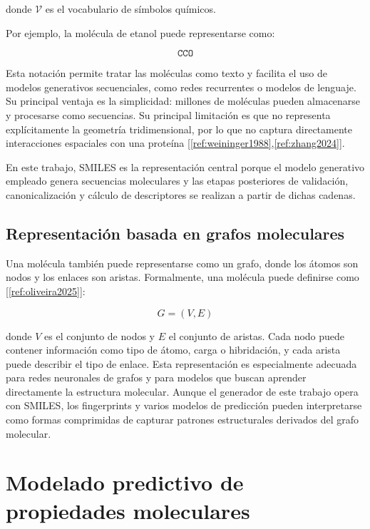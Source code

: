 \documentclass[IB]{TFUOC}%
\begin{document}
donde $\mathcal{V}$ es el vocabulario de símbolos químicos.

Por ejemplo, la molécula de etanol puede representarse como:

\begin{equation}
\texttt{CCO}
\end{equation}

Esta notación permite tratar las moléculas como texto y facilita el uso de modelos generativos secuenciales, como redes recurrentes o modelos de lenguaje. Su principal ventaja es la simplicidad: millones de moléculas pueden almacenarse y procesarse como secuencias. Su principal limitación es que no representa explícitamente la geometría tridimensional, por lo que no captura directamente interacciones espaciales con una proteína [\ref{ref:weininger1988},\ref{ref:zhang2024}].

En este trabajo, SMILES es la representación central porque el modelo generativo empleado genera secuencias moleculares y las etapas posteriores de validación, canonicalización y cálculo de descriptores se realizan a partir de dichas cadenas.

\subsection{Representación basada en grafos moleculares}

Una molécula también puede representarse como un grafo, donde los átomos son nodos y los enlaces son aristas. Formalmente, una molécula puede definirse como [\ref{ref:oliveira2025}]:

\begin{equation}
G = (V, E)
\end{equation}

donde $V$ es el conjunto de nodos y $E$ el conjunto de aristas. Cada nodo puede contener información como tipo de átomo, carga o hibridación, y cada arista puede describir el tipo de enlace. Esta representación es especialmente adecuada para redes neuronales de grafos y para modelos que buscan aprender directamente la estructura molecular. Aunque el generador de este trabajo opera con SMILES, los fingerprints y varios modelos de predicción pueden interpretarse como formas comprimidas de capturar patrones estructurales derivados del grafo molecular.


\section{Modelado predictivo de propiedades moleculares}
\end{document}
